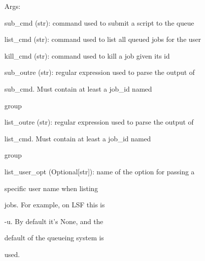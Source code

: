 \documentclass[letterpaper,10pt,english]{sphinxmanual}
\begin{document}
\begin{fulllineitems}
\begin{DUlineblock}{0em}
\item[] Args:
\item[]
\begin{DUlineblock}{\DUlineblockindent}
\item[] sub\_cmd (str): command used to submit a script to the queue
\item[] list\_cmd (str): command used to list all queued jobs for the user
\item[] kill\_cmd (str): command used to kill a job given its id
\item[] sub\_outre (str): regular expression used to parse the output of
\item[]
\begin{DUlineblock}{\DUlineblockindent}
\item[] sub\_cmd. Must contain at least a job\_id named
\item[] group
\end{DUlineblock}
\item[] list\_outre (str): regular expression used to parse the output of
\item[]
\begin{DUlineblock}{\DUlineblockindent}
\item[] list\_cmd. Must contain at least a job\_id named
\item[] group
\end{DUlineblock}
\item[] list\_user\_opt (Optional{[}str{]}): name of the option for passing a
\item[]
\begin{DUlineblock}{\DUlineblockindent}
\item[] specific user name when listing
\item[] jobs. For example, on LSF this is
\item[] -u. By default it's None, and the 
\item[] default of the queueing system is
\item[] used.
\end{DUlineblock}
\end{DUlineblock}
\end{DUlineblock}

\begin{fulllineitems}
\label{doctree/soprano.hpc.submitter.queues:soprano.hpc.submitter.queues.QueueInterface.GridEngine}
\end{fulllineitems}


\end{fulllineitems}
\end{document}
